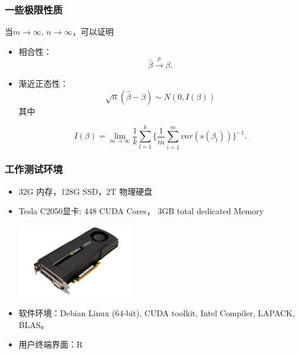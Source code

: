 \documentclass[10pt]{beamer}
\begin{document}
\begin{frame}
  \frametitle{一些极限性质}

当$m \to \infty$, $n \to \infty$，可以证明
  \begin{itemize}
  \item 相合性：
    \begin{equation*}
      {\widehat \beta} \xrightarrow{p} \beta.
    \end{equation*}

  \item 渐近正态性：
    \begin{equation*}
      \sqrt{n} (\widehat \beta -\beta) \sim N(0, I(\beta))
    \end{equation*}
    其中

    \begin{equation*}
      I(\beta) = \lim \limits_{m \to \infty} \frac{1}{k}\sum_{l=1}^k
      \{\frac{1}{m}\sum_{i=1}^m var (s(\beta_l))\}^{-1}.
\end{equation*}



  \end{itemize}
\end{frame}




\begin{frame}
  \frametitle{工作测试环境}

  \begin{itemize}

  \item 32G 内存，128G SSD，2T 物理硬盘
  \item Tesla C2050显卡: 448 CUDA Cores， 3GB total dedicated Memory

    \includegraphics[width=0.4\textwidth]{tesla}


  \item 软件环境：Debian Linux (64-bit), CUDA toolkit, Intel Compiler,
    LAPACK, BLAS。

  \item 用户终端界面：R

  \end{itemize}

\end{frame}
\end{document}
